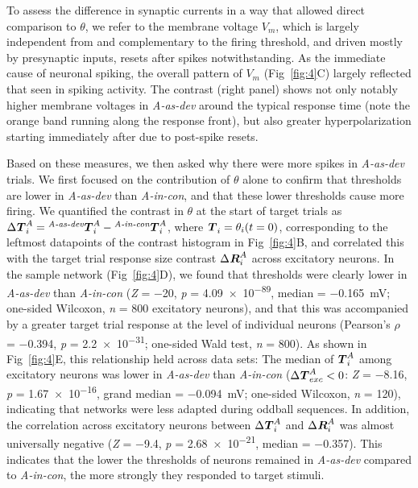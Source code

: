 \documentclass[10pt,letterpaper]{article}
\newcommand{\dev}{\textit{A-as-dev}}
\newcommand{\msc}{\textit{A-in-con}}
\newcommand{\std}{\textit{A-as-std}}
\newcommand{\ifstringequal}[4]{%
  \ifnum\pdfstrcmp{#1}{#2}=0
  #3%
  \else
  #4%
  \fi
}
\newcommand{\seqreplace}[1]{\ifstringequal{dev}{#1}{\dev}{%
    \ifstringequal{std}{#1}{\std}{%
        \ifstringequal{msc}{#1}{\msc}{#1}%
    }%
}}
\newcommand{\R}[3][]{{}^{\seqreplace{#1}}_{}\boldsymbol R^{#2}_{#3}}
\newcommand{\T}[3][]{{}^{\seqreplace{#1}}_{}\boldsymbol T^{#2}_{#3}}
\newcommand{\FIG}[1]{Fig~\ref{fig:#1}}
\newcommand{\statistic}[2]{\textit{#1} = \num{#2}}
\begin{document}
To assess the difference in synaptic currents in a way that allowed direct comparison to $\theta$, we refer to the membrane voltage $V_m$, which is largely independent from and complementary to the firing threshold, and driven mostly by presynaptic inputs, resets after spikes notwithstanding. As the immediate cause of neuronal spiking, the overall pattern of $V_m$ (\FIG{4}C) largely reflected that seen in spiking activity. The contrast (right panel) shows not only notably higher membrane voltages in \dev{} around the typical response time (note the orange band running along the response front), but also greater hyperpolarization starting immediately after due to post-spike resets.

Based on these measures, we then asked why there were more spikes in \dev{} trials. We first focused on the contribution of $\theta$ alone to confirm that thresholds are lower in \dev{} than \msc{}, and that these lower thresholds cause more firing. We quantified the contrast in $\theta$ at the start of target trials as $\Delta \T{A}{i} = \T[dev]{A}{i} - \T[msc]{A}{i}$, where $\T{}{i} = \theta_i(t=0)$, corresponding to the leftmost datapoints of the contrast histogram in \FIG{4}B, and correlated this with the target trial response size contrast $\Delta \R{A}{i}$ across excitatory neurons. In the sample network (\FIG{4}D), we found that thresholds were clearly lower in \dev{} than \msc{} (\statistic{Z}{-20}, \statistic{p}{4.09e-89}, median = \qty{-0.165}{\milli\volt}; one-sided Wilcoxon, \statistic{n}{800} excitatory neurons), and that this was accompanied by a greater target trial response at the level of individual neurons (Pearson's $\rho$ = \num{-0.394}, \statistic{p}{2.2e-31}; one-sided Wald test, \statistic{n}{800}). As shown in \FIG{4}E, this relationship held across data sets: The median of $\T{A}{i}$ among excitatory neurons was lower in \dev{} than \msc{} ($\Delta \T{A}{exc} < 0$: \statistic{Z}{-8.16}, \statistic{p}{1.67e-16}, grand median = \qty{-0.094}{\milli\volt}; one-sided Wilcoxon, \statistic{n}{120}), indicating that networks were less adapted during oddball sequences. In addition, the correlation across excitatory neurons between $\Delta \T{A}{i}$ and $\Delta \R{A}{i}$ was almost universally negative (\statistic{Z}{-9.4}, \statistic{p}{2.68e-21}, median = \num{-0.357}). This indicates that the lower the thresholds of neurons remained in \dev{} compared to \msc{}, the more strongly they responded to target stimuli.
\end{document}
